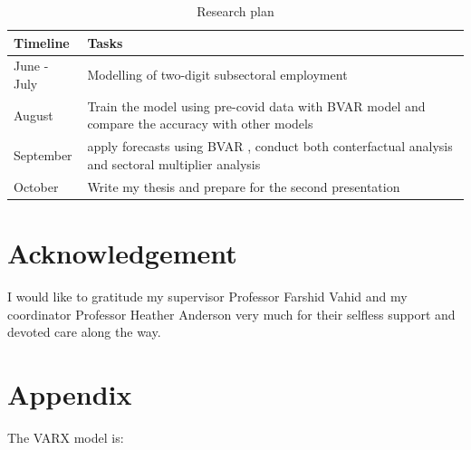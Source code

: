 \documentclass[11pt,a4paper,]{article}
\begin{document}
\begin{table}

\caption{\label{tab:timeline2}Research plan}
\centering
\begin{tabular}[t]{ll}
\toprule
Timeline & Tasks\\
\midrule
June - July & Modelling of two-digit subsectoral employment\\
August & Train the model using pre-covid data with BVAR model and compare the accuracy with other models\\
September & apply forecasts using BVAR , conduct both conterfactual analysis and sectoral multiplier analysis\\
October & Write my thesis and prepare for the second presentation\\
\bottomrule
\end{tabular}
\end{table}

\hypertarget{acknowledgement}{%
\section{Acknowledgement}\label{acknowledgement}}

I would like to gratitude my supervisor Professor Farshid Vahid and my coordinator Professor Heather Anderson very much for their selfless support and devoted care along the way.

\hypertarget{appendix}{%
\section{Appendix}\label{appendix}}

The VARX model is:
\end{document}
